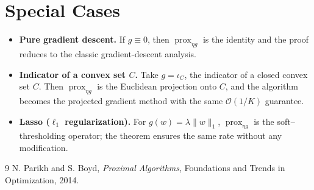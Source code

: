 \documentclass{article}
\newcommand{\prox}{\operatorname{prox}}
\begin{document}
\section*{Special Cases}
\begin{itemize}
\item \textbf{Pure gradient descent.} If $g\equiv0$, then $\prox_{\eta g}$ is the identity and the proof reduces to the classic gradient‑descent analysis.
\item \textbf{Indicator of a convex set $C$.} Take $g=\iota_{C}$, the indicator of a closed convex set $C$. Then $\prox_{\eta g}$ is the Euclidean projection onto $C$, and the algorithm becomes the projected gradient method with the same $\mathcal{O}(1/K)$ guarantee.
\item \textbf{Lasso ($\ell_{1}$ regularization).} For $g(w)=\lambda\|w\|_{1}$, $\prox_{\eta g}$ is the soft–thresholding operator; the theorem ensures the same rate without any modification.
\end{itemize}

\begin{thebibliography}{9}
N. Parikh and S. Boyd, \emph{Proximal Algorithms}, Foundations and Trends in Optimization, 2014.
\end{thebibliography}
\end{document}
